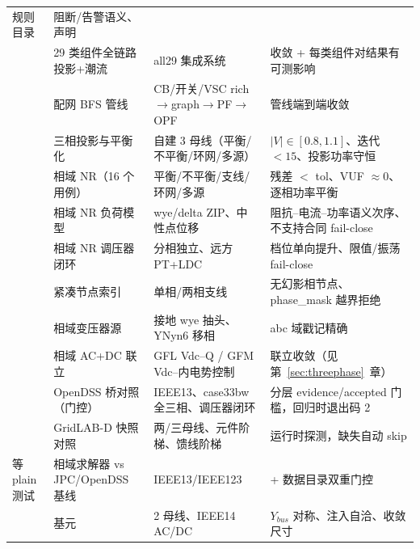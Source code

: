 \begin{footnotesize}
\begin{longtable}{@{}L{3.9cm}L{3.2cm}L{3.5cm}L{4.4cm}@{}}
  规则目录  &
  阻断/告警语义、 声明\\
 & 29 类组件全链路投影+潮流 &
  all29 集成系统 &
  收敛 + 每类组件对结果有可测影响\\
 & 配网 BFS 管线 &
  CB/开关/VSC rich$\to$graph$\to$PF$\to$OPF &
  管线端到端收敛\\
 & 三相投影与平衡化 &
  自建 3 母线（平衡/不平衡/环网/多源） &
  $|V|\in[0.8,1.1]$、迭代 $<15$、投影功率守恒\\
 & 相域 NR（16 个用例）&
  平衡/不平衡/支线/环网/多源 &
  残差 $<$ tol、VUF $\approx 0$、逐相功率平衡\\
 & 相域 NR 负荷模型 &
  wye/delta ZIP、中性点位移 &
  阻抗--电流--功率语义次序、不支持合同 fail-close\\
 & 相域 NR 调压器闭环 &
  分相独立、远方 PT+LDC &
  档位单向提升、限值/振荡 fail-close\\
 & 紧凑节点索引 &
  单相/两相支线 &
  无幻影相节点、phase\_mask 越界拒绝\\
 & 相域变压器源 &
  接地 wye 抽头、YNyn6 移相 &
  abc 域戳记精确\\
 & 相域 AC+DC 联立 &
  GFL Vdc--Q / GFM Vdc--内电势控制 &
  联立收敛（见第~\ref{sec:threephase}~章）\\
 & OpenDSS 桥对照（门控）&
  IEEE13、case33bw 全三相、调压器闭环 &
  分层 evidence/accepted 门槛，回归时退出码 2\\
 & GridLAB-D 快照对照 &
  两/三母线、元件阶梯、馈线阶梯 &
  运行时探测，缺失自动 skip\\
 等 plain 测试 & 相域求解器 vs JPC/OpenDSS 基线 &
  IEEE13/IEEE123 &
   + 数据目录双重门控\\
 &  基元 &
  2 母线、IEEE14 AC/DC &
  $Y_{bus}$ 对称、注入自洽、收敛尺寸\\
\bottomrule
\end{longtable}
\end{footnotesize}

